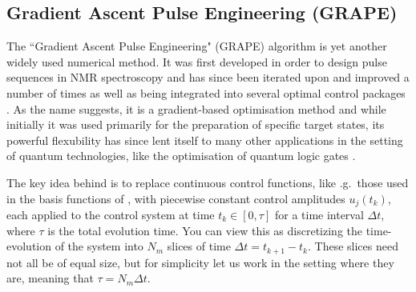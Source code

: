 \subsection{Gradient Ascent Pulse Engineering (GRAPE)}\label{sec:3.3.2_GRAPE}

The ``Gradient Ascent Pulse Engineering" (GRAPE) algorithm is yet another widely used  numerical method. It was first developed in order to design pulse sequences in NMR spectroscopy \cite{khaneja_optimal_2005} and has since been iterated upon and improved a number of times as well as being integrated into several optimal control packages \cite{de_fouquieres_second_2011, chen_iterative_2022, machnes_comparing_2011, johansson_qutip_2013}. As the name suggests, it is a gradient-based optimisation method and while initially it was used primarily for the preparation of specific target states, its powerful flexubility has since lent itself to many other applications in the setting of quantum technologies, like the optimisation of quantum logic gates \cite{motzoi_optimal_2011, anderson_accurate_2015}.

The key idea behind  is to replace continuous control functions, like \@e.g.~those used in the basis functions of , with piecewise constant control amplitudes $u_j(t_k)$, each applied to the control system at time $t_k \in [0, \tau]$ for a time interval $\Delta t$, where $\tau$ is the total evolution time. You can view this as discretizing the time-evolution of the system into $N_m$ slices of time $\Delta t = t_{k + 1} - t_k$. These slices need not all be of equal size, but for simplicity let us work in the setting where they are, meaning that $\tau = N_m \Delta t$.

